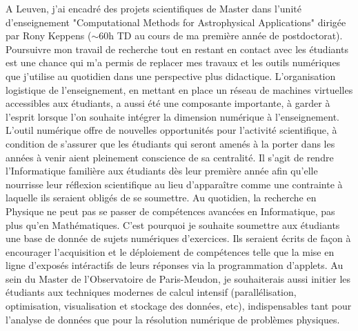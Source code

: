 \documentclass[paper=a4, fontsize=12pt,twoside]{scrartcl}
\begin{document}
\indent A Leuven, j'ai encadr\'e des projets scientifiques de Master dans l'unit\'e d'enseignement "Computational Methods for Astrophysical Applications" dirig\'ee par Rony Keppens ($\sim$60h TD au cours de ma premi\`ere ann\'ee de postdoctorat). Poursuivre mon travail de recherche tout en restant en contact avec les \'etudiants est une chance qui m'a permis de replacer mes travaux et les outils num\'eriques que j'utilise au quotidien dans une perspective plus didactique. L'organisation logistique de l'enseignement, en mettant en place un r\'eseau de machines virtuelles accessibles aux \'etudiants, a aussi \'et\'e une composante importante, \`a garder \`a l'esprit lorsque l'on souhaite int\'egrer la dimension num\'erique \`a l'enseignement.\\
\indent L'outil num\'erique offre de nouvelles opportunit\'es pour l'activit\'e scientifique, \`a condition de s'assurer que les \'etudiants qui seront amen\'es \`a la porter dans les ann\'ees \`a venir aient pleinement conscience de sa centralit\'e. Il s'agit de rendre l'Informatique famili\`ere aux \'etudiants d\`es leur premi\`ere ann\'ee afin qu'elle nourrisse leur r\'eflexion scientifique au lieu d'appara\^itre comme une contrainte \`a laquelle ils seraient oblig\'es de se soumettre. Au quotidien, la recherche en Physique ne peut pas se passer de comp\'etences avanc\'ees en Informatique, pas plus qu'en Math\'ematiques. C'est pourquoi je souhaite soumettre aux \'etudiants une base de donn\'ee de sujets num\'eriques d'exercices. Ils seraient \'ecrits de fa\c con \`a encourager l'acquisition et le d\'eploiement de comp\'etences telle que la mise en ligne d'expos\'es int\'eractifs de leurs r\'eponses via la programmation d'applets. Au sein du Master de l'Observatoire de Paris-Meudon, je souhaiterais aussi initier les \'etudiants aux techniques modernes de calcul intensif (parall\'elisation, optimisation, visualisation et stockage des donn\'ees, etc), indispensables tant pour l'analyse de donn\'ees que pour la r\'esolution num\'erique de probl\`emes physiques. 




\end{document}
